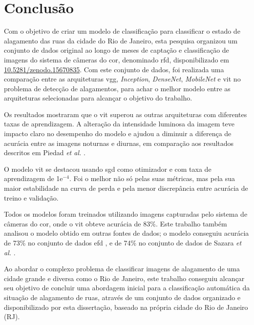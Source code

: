 \chapter{Conclusão}\label{cap:conclusoes}

Com o objetivo de criar um modelo de classificação para classificar o estado de alagamento das ruas da cidade do Rio de Janeiro,
esta pesquisa organizou um conjunto de dados original ao longo de meses de captação e classificação de imagens do sistema de câmeras do \acrshort{cor}, denominado \acrshort{rfd}, disponibilizado em \href{https://doi.org/10.5281/zenodo.15670835}{10.5281/zenodo.15670835}.
Com este conjunto de dados, foi realizada uma comparação entre as arquiteturas \acrshort{vgg}, \textit{Inception}, \textit{DenseNet}, \textit{MobileNet} e \Acrshort{vit} no problema de detecção de alagamentos,
para achar o melhor modelo entre as arquiteturas selecionadas para alcançar o objetivo do trabalho.

Os resultados mostraram que o \acrshort{vit} superou as outras arquiteturas com diferentes taxas de aprendizagem.
A alteração da intensidade luminosa da imagem teve impacto claro no desempenho do modelo e ajudou a diminuir a diferença de acurácia entre as imagens noturnas e diurnas,
em comparação aos resultados descritos em Piedad \textit{et al.} \cite{piedad2022}.

O modelo \acrshort{vit} se destacou usando \acrshort{sgd} como otimizador e com taxa de aprendizagem de 1e$^{-4}$.
Foi o melhor não só pelas suas métricas, mas pela sua maior estabilidade na curva de perda e pela menor discrepância entre acurácia de treino e validação.

Todos os modelos foram treinados utilizando imagens capturadas pelo sistema de câmeras do \acrshort{cor}, onde o \acrshort{vit} obteve acurácia de 83\%.
Este trabalho também analisou o modelo obtido em outras fontes de dados; o modelo conseguiu acurácia de 73\% no conjunto de dados \acrshort{efd} \cite{BarzSchroeterMuench2018_1000117723},
e de 74\% no conjunto de dados de Sazara \textit{et al.} \cite{sazara2019}.

Ao abordar o complexo problema de classificar imagens de alagamento de uma cidade grande e diversa como o Rio de Janeiro,
este trabalho conseguiu alcançar seu objetivo de concluir uma abordagem inicial para a classificação automática da situação de alagamento de ruas,
através de um conjunto de dados organizado e disponibilizado por esta dissertação, baseado na própria cidade do Rio de Janeiro (RJ).

